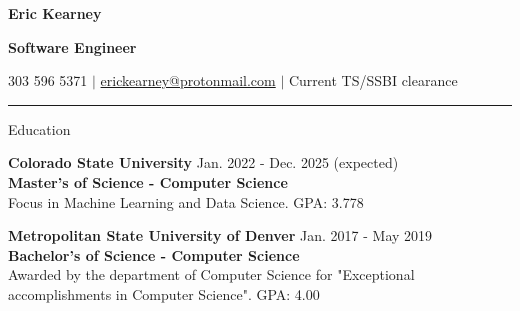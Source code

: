 \documentclass[12pt]{resumeclass}
\begin{document}
\vspace{12pt}
\centerline{\textbf{\LARGE{Eric Kearney}}}
\vspace{2pt}
\centerline{\textbf{\large{Software Engineer}}}
\vspace{2pt}
\centerline{303 596 5371 $|$
\href{mailto:erickearney@protonmail.com}{erickearney@protonmail.com} $|$ Current
TS/SSBI clearance}
\vspace{2pt}
\rule{\textwidth}{0.4pt}
\vspace{0.5pt}

\resumesect
    {Education}
    {\textbf{Colorado State University} \hfill \normalsize{Jan. 2022 - Dec. 2025
    (expected)}\\
    \small{\textbf{Master's of Science - Computer Science}\\
    Focus in Machine Learning and Data Science. GPA: 3.778}

    \vspace{6pt}
    \textbf{Metropolitan State University of Denver} \hfill \normalsize{Jan.
    2017 - May 2019}\\
    \small{\textbf{Bachelor's of Science - Computer Science}\\
    Awarded by the department of Computer Science for "Exceptional
    accomplishments in Computer Science". GPA: 4.00}}
\end{document}
